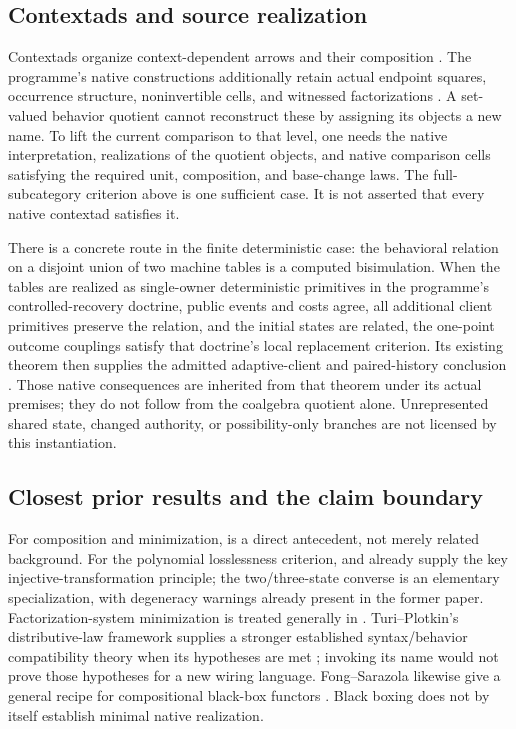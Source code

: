 \documentclass[11pt]{article}
\theoremstyle{definition}
\theoremstyle{remark}\newtheorem{remark}[theorem]{Remark}
\begin{document}
\subsection{Contextads and source realization}
Contextads organize context-dependent arrows and their composition
\cite{contextads}. The programme's native constructions additionally retain
actual endpoint squares, occurrence structure, noninvertible cells, and
witnessed factorizations \cite{RelativeNote,RecoveryNote}. A set-valued
behavior quotient cannot reconstruct these by assigning its objects a new
name. To lift the current comparison to that level, one needs the native
interpretation, realizations of the quotient objects, and native comparison
cells satisfying the required unit, composition, and base-change laws.
The full-subcategory criterion above is one sufficient case. It is not
asserted that every native contextad satisfies it.

There is a concrete route in the finite deterministic case: the behavioral
relation on a disjoint union of two machine tables is a computed bisimulation.
When the tables are realized as single-owner deterministic primitives in the
programme's controlled-recovery doctrine, public events and costs agree,
all additional client primitives preserve the relation, and the initial
states are related, the one-point outcome couplings satisfy that doctrine's
local replacement criterion. Its existing theorem then supplies the
admitted adaptive-client and paired-history conclusion \cite{RecoveryNote}.
Those native consequences are inherited from that theorem under its actual
premises; they do not follow from the coalgebra quotient alone. Unrepresented
shared state, changed authority, or possibility-only branches are not
licensed by this instantiation.

\subsection{Closest prior results and the claim boundary}
For composition and minimization, \cite[Propositions 14, 43, 46 and
Corollary 47]{RSW} is a direct antecedent, not merely related background.
For the polynomial losslessness criterion, \cite[Theorem 3.9]{bartels}
and \cite[Lemma 4.6]{bonchi} already supply the key injective-transformation
principle; the two/three-state converse is an elementary specialization,
with degeneracy warnings already present in the former paper.
Factorization-system minimization is treated generally in \cite{wissmann}.
Turi--Plotkin's distributive-law framework supplies a stronger established
syntax/behavior compatibility theory when its hypotheses are met
\cite{turi}; invoking its name would not prove those hypotheses for a new
wiring language. Fong--Sarazola likewise give a general recipe for
compositional black-box functors \cite{blackbox}. Black boxing does not
by itself establish minimal native realization.
\end{document}
